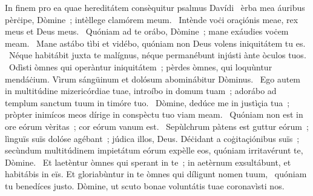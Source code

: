 { In finem pro ea quae hereditátem consèquitur psalmus Davídi}
{%
~èrba mea áuribus pèrċipe, Dòmine~; intèllege clamórem meum.
~Intènde voċi oraçiónis meae, rex meus et Deus meus.
~Quóniam ad te orábo, Dòmine~; mane exáudies voċem meam.
~Mane astábo tìbi et vidébo, quóniam non Deus volens iniquitátem tu es.
~Néque habitábit juxta te malígnus, néque permanébunt injústi ànte òculos tuos.
~Odìsti òmnes qui operàntur iniquitátem~; pèrdes òmnes, qui loquùntur mendáċium. Vìrum sángüinum et dolósum abominábitur Dòminus.
~Ego autem in multitúdine mizericórdiae tuae, introíbo in domum tuam~; adorábo ad templum sanctum tuum in timóre tuo.
~Dòmine, dedúce me in justìçia tua~; pròpter inimícos meos dírige in conspèctu tuo viam meam.
~Quóniam non est in ore eórum vèritas~; cor eórum vanum est.
~Sepùlchrum pàtens est guttur eórum~; lìnguïs suïs dolóse agébant~; júdica illos, Deus. Déċidant a coġitaçiónibus suïs~; secùndum multitúdinem impietátum eórum expèlle eos, quóniam irritavérunt te, Dòmine.
~Et laetèntur òmnes qui sperant in te~; in aetèrnum exsultábunt, et habitábis in eïs. Et gloriabùntur in te òmnes qui díligunt nomen tuum,
~quóniam tu benedíces justo. Dòmine, ut scuto bonae voluntátis tuae coronavìsti nos.
}
